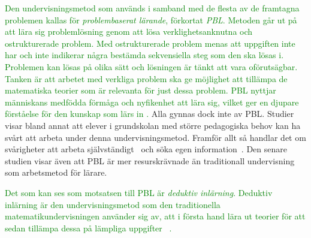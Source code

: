\textcolor{green}{Den undervisningsmetod som används i samband med de flesta av de framtagna problemen kallas för \textit{problembaserat lärande}, förkortat \textit{PBL}. Metoden går ut på att lära sig problemlösning genom att lösa verklighetsanknutna och ostrukturerade problem. Med ostrukturerade problem menas att uppgiften inte har och inte indikerar några bestämda sekvensiella steg som den ska lösas i. Problemen kan lösas på olika sätt och lösningen är tänkt att vara oförutsägbar. Tanken är att arbetet med verkliga problem ska ge möjlighet att tillämpa de matematiska teorier som är relevanta för just dessa problem. PBL nyttjar människans medfödda förmåga och nyfikenhet att lära sig, vilket ger en djupare förståelse för den kunskap som lärs in \cite{PBLdefinition} \cite{djupareKunskapPBL}.} \textcolor{Mahogany}{Alla gynnas dock inte av PBL. Studier visar bland annat att elever i grundskolan med större pedagogiska behov kan ha svårt att arbeta under denna undervisningsmetod. Framför allt så handlar det om svårigheter att arbeta självständigt~\cite{Johansson} och söka egen information~\cite{Carlsson}. Den senare studien visar även att PBL är mer resurskrävnade än traditionall undervisning som arbetsmetod för lärare.}

\textcolor{green}{Det som kan ses som motsatsen till PBL är \textit{deduktiv inlärning}. Deduktiv inlärning är den undervisningsmetod som den traditionella matematikundervisningen använder sig av, att i första hand lära ut teorier för att sedan tillämpa dessa på lämpliga uppgifter ~\cite{deduktivInlärning}.}

